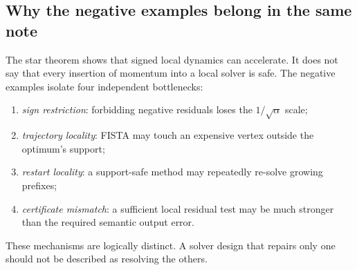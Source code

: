 \subsection{Why the negative examples belong in the same note}

The star theorem shows that signed local dynamics can accelerate.  It does not
say that every insertion of momentum into a local solver is safe.  The
negative examples isolate four independent bottlenecks:

\begin{enumerate}[leftmargin=*]
\item \emph{sign restriction}: forbidding negative residuals loses the
      $1/\sqrt\alpha$ scale;
\item \emph{trajectory locality}: FISTA may touch an expensive vertex outside
      the optimum's support;
\item \emph{restart locality}: a support-safe method may repeatedly re-solve
      growing prefixes;
\item \emph{certificate mismatch}: a sufficient local residual test may be
      much stronger than the required semantic output error.
\end{enumerate}

These mechanisms are logically distinct.  A solver design that repairs only
one should not be described as resolving the others.
